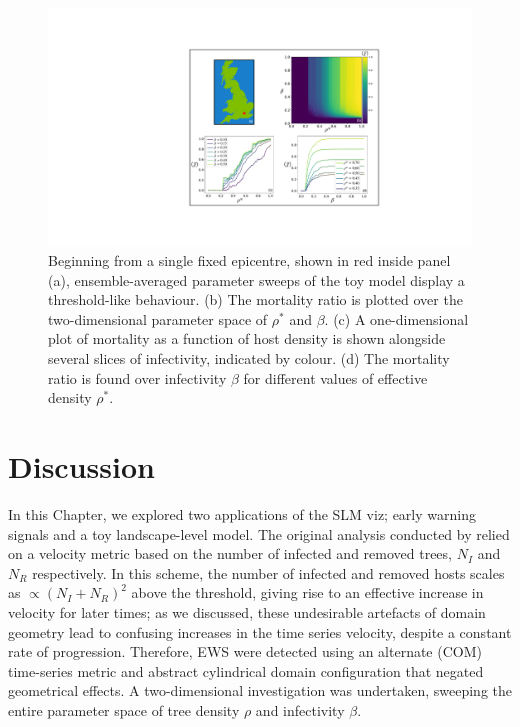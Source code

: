 \begin{figure}
    \centering
    \includegraphics[scale=0.55]{chapter4/figures/figure4-param-sweeps.pdf}
    \caption{
    Beginning from a single fixed epicentre, shown in red inside panel (a),
    ensemble-averaged parameter sweeps of the toy model display a threshold-like behaviour.
    (b) The mortality ratio is plotted over the two-dimensional parameter space of $\rho^*$ and $\beta$. 
    (c) A one-dimensional plot of mortality as a function of host density is shown alongside several slices of infectivity, indicated by colour.
    (d) The mortality ratio is found over infectivity $\beta$ for different values of effective density $\rho^{*}$.
    }
    \label{fig:heterogeneous-phase-space}
\end{figure}

\newpage

\section{Discussion}
\label{sec:ch4-discussion}

In this Chapter, we explored two applications of the SLM viz; early warning signals and a toy landscape-level model.
The original analysis conducted by \cite{OROZCOFUENTES201912} relied on a velocity metric based on the number of 
infected and removed trees, $N_I$ and $N_R$ respectively. In this scheme, the number of infected and removed hosts scales as
$\propto (N_I + N_R)^2$ above the threshold, giving rise to an effective increase in velocity for later times;
as we discussed, these undesirable artefacts of domain geometry lead to confusing increases in the time series velocity, 
despite a constant rate of progression. Therefore, EWS were detected using an alternate (COM) time-series metric and abstract 
cylindrical domain configuration that negated geometrical effects.
A two-dimensional investigation was undertaken, sweeping the entire parameter space of tree density $\rho$ and infectivity $\beta$.


